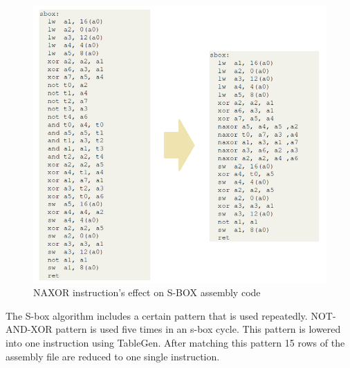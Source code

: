 \begin{figure}
    \centering
    \includegraphics[scale=0.3]{naxor_instruction.png}
    \caption{NAXOR instruction's effect on S-BOX assembly code}
    \label{fig:sbox_instruction}
\end{figure}
The S-box algorithm includes a certain pattern that is used repeatedly.
NOT-AND-XOR pattern is used five times in an s-box cycle. This pattern is lowered
into one instruction using TableGen. After matching this pattern 15 rows of the
assembly file are reduced to one single instruction.

